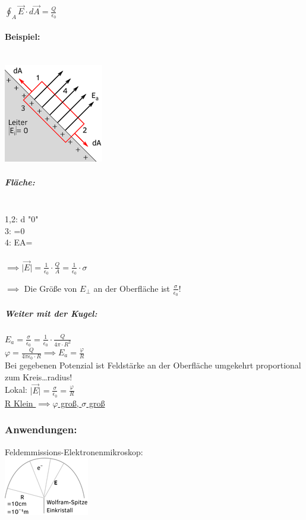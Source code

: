 \documentclass[11pt]{article}
\begin{document}
$ \displaystyle\oint_{A}\vec{E}\cdot d\vec{A} = \frac{Q}{\epsilon_0} $\\

\paragraph{Beispiel:}
\hfill\\
\includegraphics{skizzen/14/14_8B1}
\\
\subparagraph{Fläche:}
\hfill\\
1,2: \perp d \implies "0"\\
3: =0 \\
4: E\cdot A= \\
\hfill\\

$ \implies \vert\vec{E}\vert = \frac{1}{\epsilon_0}\cdot \frac{Q}{A} = \frac{1}{\epsilon_0}\cdot\sigma $

$\implies$ Die Größe von $E_\perp$ an der Oberfläche ist $\frac{\sigma}{\epsilon_0}$!\\

\subparagraph{Weiter mit der Kugel:} $ E_a= \frac{\sigma}{\epsilon_0}=\frac{1}{\epsilon_0}\cdot\frac{Q}{4\pi\cdot R^2} $\\

$ \varphi = \frac{Q}{4\pi\epsilon_0\cdot R} \implies E_a=\frac{\varphi}{R}$\\

Bei gegebenen Potenzial ist Feldstärke an der Oberfläche umgekehrt proportional zum Kreis…radius!\\

Lokal: $ \vert\vec{E}\vert = \frac{\sigma}{\epsilon_0}=\frac{\varphi}{R} $\\

\underline{R Klein $\implies \varphi$ groß, $\sigma$ groß}\\

\subsubsection{Anwendungen:} Feldemmissions-Elektronenmikroskop:
\hfill\\
\includegraphics{skizzen/14/14_8B2}\\
\end{document}
